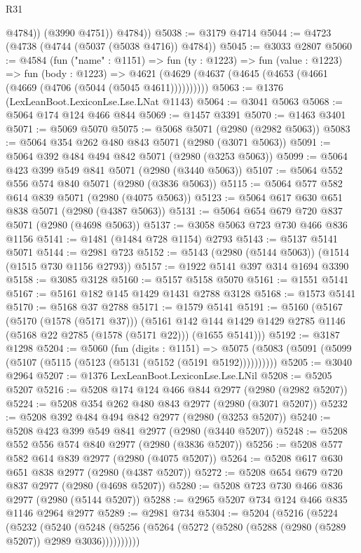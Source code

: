 \begin{lexlean}{R31}
\begin{coremodule}
              @4784))
          (@3990 @4751))
        @4784))
@5038 := @3179 @4714
@5044 := @4723 (@4738 (@4744 (@5037 (@5038 @4716)) @4784))
@5045 := @3033 @2807
@5060 := @4584
    (fun ("name" : @1151) =>
    fun (ty : @1223) =>
    fun (value : @1223) =>
    fun (body : @1223) =>
    @4621 (@4629 (@4637 (@4645 (@4653 (@4661 (@4669 (@4706 (@5044 (@5045 @4611))))))))))
@5063 := @1376 (LexLeanBoot.LexiconLse.Lse.LNat @1143)
@5064 := @3041 @5063
@5068 := @5064 @174 @124 @466 @844
@5069 := @1457 @3391
@5070 := @1463 @3401
@5071 := @5069 @5070
@5075 := @5068 @5071 (@2980 (@2982 @5063))
@5083 := @5064 @354 @262 @480 @843 @5071 (@2980 (@3071 @5063))
@5091 := @5064 @392 @484 @494 @842 @5071 (@2980 (@3253 @5063))
@5099 := @5064 @423 @399 @549 @841 @5071 (@2980 (@3440 @5063))
@5107 := @5064 @552 @556 @574 @840 @5071 (@2980 (@3836 @5063))
@5115 := @5064 @577 @582 @614 @839 @5071 (@2980 (@4075 @5063))
@5123 := @5064 @617 @630 @651 @838 @5071 (@2980 (@4387 @5063))
@5131 := @5064 @654 @679 @720 @837 @5071 (@2980 (@4698 @5063))
@5137 := @3058 @5063 @723 @730 @466 @836 @1156
@5141 := @1481 (@1484 @728 @1154) @2793
@5143 := @5137 @5141 @5071
@5144 := @2981 @723
@5152 := @5143 (@2980 (@5144 @5063)) (@1514 (@1515 @730 @1156 @2793))
@5157 := @1922 @5141 @397 @314 @1694 @3390
@5158 := @3085 @3128
@5160 := @5157 @5158 @5070
@5161 := @1551 @5141
@5167 := @5161 @182 @145 @1429 @1431 @2788 @3128
@5168 := @1573 @5141
@5170 := @5168 @37 @2788
@5171 := @1579 @5141
@5191 := @5160
    (@5167
      (@5170 (@1578 (@5171 @37)))
      (@5161 @142 @144 @1429 @1429 @2785 @1146 (@5168 @22 @2785 (@1578 (@5171 @22))) (@1655 @5141)))
@5192 := @3187 @1298
@5204 := @5060
    (fun (digits : @1151) =>
    @5075 (@5083 (@5091 (@5099 (@5107 (@5115 (@5123 (@5131 (@5152 (@5191 @5192))))))))))
@5205 := @3040 @2964
@5207 := @1376 LexLeanBoot.LexiconLse.Lse.LNil
@5208 := @5205 @5207
@5216 := @5208 @174 @124 @466 @844 @2977 (@2980 (@2982 @5207))
@5224 := @5208 @354 @262 @480 @843 @2977 (@2980 (@3071 @5207))
@5232 := @5208 @392 @484 @494 @842 @2977 (@2980 (@3253 @5207))
@5240 := @5208 @423 @399 @549 @841 @2977 (@2980 (@3440 @5207))
@5248 := @5208 @552 @556 @574 @840 @2977 (@2980 (@3836 @5207))
@5256 := @5208 @577 @582 @614 @839 @2977 (@2980 (@4075 @5207))
@5264 := @5208 @617 @630 @651 @838 @2977 (@2980 (@4387 @5207))
@5272 := @5208 @654 @679 @720 @837 @2977 (@2980 (@4698 @5207))
@5280 := @5208 @723 @730 @466 @836 @2977 (@2980 (@5144 @5207))
@5288 := @2965 @5207 @734 @124 @466 @835 @1146 @2964 @2977
@5289 := @2981 @734
@5304 := @5204
    (@5216
      (@5224
        (@5232
          (@5240
            (@5248 (@5256 (@5264 (@5272 (@5280 (@5288 (@2980 (@5289 @5207)) @2989 @3036))))))))))

\end{coremodule}
\end{lexlean}
